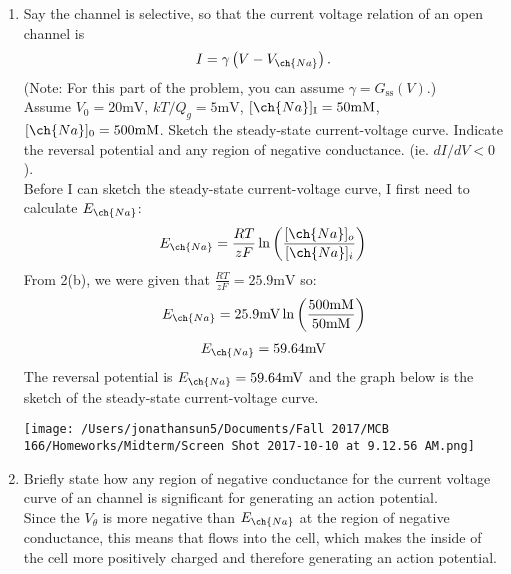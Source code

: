 \documentclass[11pt]{article}
\begin{document}
\begin{enumerate}[label=\arabic*.]
\begin{enumerate}[label=(\alph*)]
\newpage
\item
Say the channel is  selective, so that the current voltage relation of an open channel is
\begin{align*}
I = \gamma \left(V - V_{\ch{Na}}\right).
\end{align*}
(Note: For this part of the problem, you can assume $\gamma = G_{\text{ss}}(V)$.) \\
Assume $V_0 = 20 \text{mV}$, $k T / Q_g =5 \text{mV}$, $[\ch{Na}]_{\text{I}} = 50 \text{mM}$, $[\ch{Na}]_0 = 500 \text{mM}$. Sketch the steady-state current-voltage curve. Indicate the reversal potential and any region of negative conductance. (ie. $dI / dV < 0$).
\vspace*{1\baselineskip}
\\
Before I can sketch the steady-state current-voltage curve, I first need to calculate $E_{\ch{Na}}$:
\begin{align*}
E_{\ch{Na}} = \frac{R T} {z F} \ln{\left(\frac{[\ch{Na}]_o} {[\ch{Na}]_i}\right)}
\end{align*}
From 2(b), we were given that $\frac{R T} {z F} = 25.9 \text{mV}$ so:
\begin{align*}
E_{\ch{Na}} = 25.9 \text{mV} \ln{\left(\frac{500 \text{mM}} {50 \text{mM}}\right)}
\end{align*}
\begin{align*}
E_{\ch{Na}} = 59.64 \text{mV}
\end{align*}
The reversal potential is $E_{\ch{Na}} = 59.64 \text{mV}$ and the graph below is the sketch of the steady-state current-voltage curve.
\begin{center}
\texttt{[image: /Users/jonathansun5/Documents/Fall 2017/MCB 166/Homeworks/Midterm/Screen Shot 2017-10-10 at 9.12.56 AM.png]}
\end{center}



\newpage
\item
Briefly state how any region of negative conductance for the current voltage curve of an  channel is significant for generating an action potential.
\vspace*{1\baselineskip}
\\
Since the $V_{\theta}$ is more negative than $E_{\ch{Na}}$ at the region of negative conductance, this means that  flows into the cell, which makes the inside of the cell more positively charged and therefore generating an action potential.
\end{enumerate}
\end{enumerate}
\end{document}
